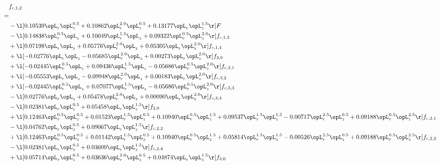 \begin{alignat}{2} 
\label{eq:f_12_2} 
& f_{c,1,2} \nonumber \\ 
 = \\ 
& - \l[  0.10539 \opL_r \opL_z^{0.5} +  0.10862 \opL_r^{2.0} \opL_z^{0.5} +  0.13177 \opL_r \opL_z^{1.5}  \r] F \nonumber \\ 
& - \l[  0.14838 \opL_r^{0.5} \opL_z +  0.10049 \opL_r^{1.5} \opL_z +  0.09322 \opL_r^{0.5} \opL_z^{2.0}  \r] f_{c,1,3} \nonumber \\ 
& + \l[  0.07198 \opL_r \opL_z +  0.05776 \opL_r^{2.0} \opL_z +  0.05305 \opL_r \opL_z^{2.0}  \r] f_{c,1,4} \nonumber \\ 
& + \l[  -0.02776 \opL_r \opL_z   -0.05685 \opL_r^{2.0} \opL_z +  0.00273 \opL_r \opL_z^{2.0}  \r] f_{3,0} \nonumber \\ 
& + \l[  -0.02445 \opL_r^{0.5} \opL_z +  0.09436 \opL_r^{1.5} \opL_z   -0.05686 \opL_r^{0.5} \opL_z^{2.0}  \r] f_{c,3,1} \nonumber \\ 
& + \l[  -0.05553 \opL_r \opL_z   -0.09948 \opL_r^{2.0} \opL_z +  0.00183 \opL_r \opL_z^{2.0}  \r] f_{c,3,2} \nonumber \\ 
& + \l[  -0.02445 \opL_r^{0.5} \opL_z +  0.07077 \opL_r^{1.5} \opL_z   -0.05686 \opL_r^{0.5} \opL_z^{2.0}  \r] f_{c,3,3} \nonumber \\ 
& - \l[  0.02776 \opL_r \opL_z +  0.05478 \opL_r^{2.0} \opL_z +  0.00090 \opL_r \opL_z^{2.0}  \r] f_{c,3,4} \nonumber \\ 
& - \l[  0.02381 \opL_r \opL_z^{0.5} +  0.05458 \opL_r \opL_z^{1.5}  \r] f_{2,0} \nonumber \\ 
& + \l[  0.12463 \opL_r^{0.5} \opL_z^{0.5} +  0.01523 \opL_r^{1.5} \opL_z^{0.5} +  0.10940 \opL_r^{0.5} \opL_z^{1.5} +  0.09537 \opL_r^{1.5} \opL_z^{1.5}   -0.00717 \opL_r^{2.5} \opL_z^{0.5} +  0.09188 \opL_r^{0.5} \opL_z^{2.5}  \r] f_{c,2,1} \nonumber \\ 
& - \l[  0.04762 \opL_r \opL_z^{0.5} +  0.09067 \opL_r \opL_z^{1.5}  \r] f_{c,2,2} \nonumber \\ 
& + \l[  0.12463 \opL_r^{0.5} \opL_z^{0.5} +  0.01142 \opL_r^{1.5} \opL_z^{0.5} +  0.10940 \opL_r^{0.5} \opL_z^{1.5} +  0.05814 \opL_r^{1.5} \opL_z^{1.5}   -0.00526 \opL_r^{2.5} \opL_z^{0.5} +  0.09188 \opL_r^{0.5} \opL_z^{2.5}  \r] f_{c,2,3} \nonumber \\ 
& - \l[  0.02381 \opL_r \opL_z^{0.5} +  0.03609 \opL_r \opL_z^{1.5}  \r] f_{c,2,4} \nonumber \\ 
& + \l[  0.05714 \opL_r \opL_z^{0.5} +  0.03636 \opL_r^{2.0} \opL_z^{0.5} +  0.04874 \opL_r \opL_z^{1.5}  \r] f_{4,0} \nonumber \\ 

\end{alignat}
